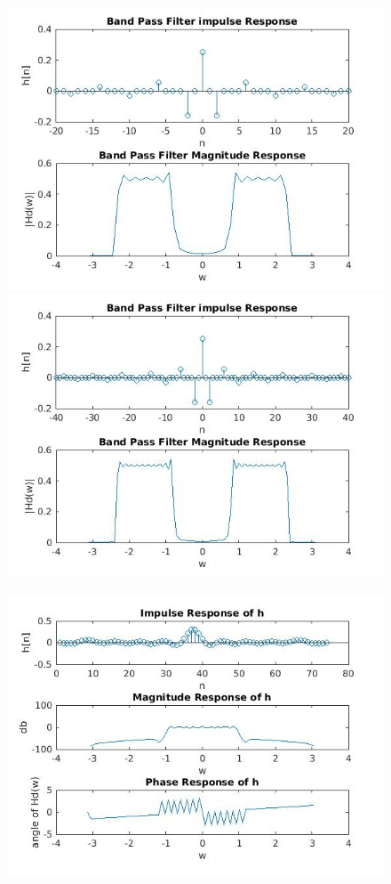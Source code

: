 \documentclass{article}
\begin{document}
\begin{figure}[H]
\includegraphics[scale = .5]{1_bpf_20}
\includegraphics[scale = .5]{1_bpf_40}
\end{figure}

\begin{figure}[H]

\includegraphics[scale = .5]{report2}
\end{figure}
\end{document}
